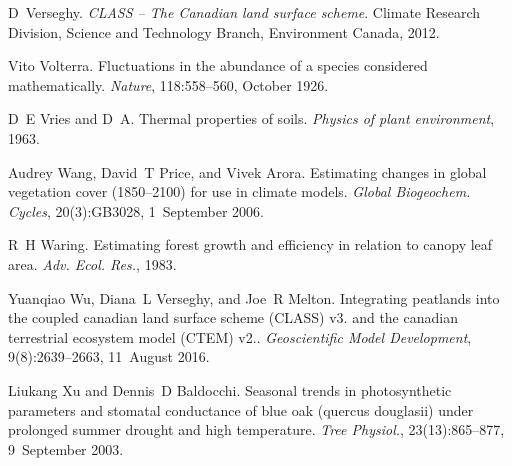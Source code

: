 \begin{DoxyDescription}
\item[\label{_CITEREF_Verseghy2012-c0e}%
\mbox{[}72\mbox{]}]D~Verseghy. {\itshape C\+L\+A\+S\+S -- The Canadian land surface scheme}. Climate Research Division, Science and Technology Branch, Environment Canada, 2012.


\item[\label{_CITEREF_Volterra1926-iz}%
\mbox{[}73\mbox{]}]Vito Volterra. Fluctuations in the abundance of a species considered mathematically. {\itshape Nature}, 118\+:558--560, October 1926. 


\item[\label{_CITEREF_Vries1963-ti}%
\mbox{[}74\mbox{]}]D~E Vries and D~A. Thermal properties of soils. {\itshape Physics of plant environment}, 1963.


\item[\label{_CITEREF_Wang2006-he}%
\mbox{[}75\mbox{]}]Audrey Wang, David~T Price, and Vivek Arora. Estimating changes in global vegetation cover (1850–2100) for use in climate models. {\itshape Global Biogeochem. Cycles}, 20(3)\+:G\+B3028, 1~September 2006. 


\item[\label{_CITEREF_Waring1983-wc}%
\mbox{[}76\mbox{]}]R~H Waring. Estimating forest growth and efficiency in relation to canopy leaf area. {\itshape Adv. Ecol. Res.}, 1983. 


\item[\label{_CITEREF_Wu2016-zt}%
\mbox{[}77\mbox{]}]Yuanqiao Wu, Diana~L Verseghy, and Joe~R Melton. Integrating peatlands into the coupled canadian land surface scheme (C\+L\+A\+S\+S) v3. and the canadian terrestrial ecosystem model (C\+T\+E\+M) v2.. {\itshape Geoscientific Model Development}, 9(8)\+:2639--2663, 11~August 2016. 


\item[\label{_CITEREF_Xu2003-d75}%
\mbox{[}78\mbox{]}]Liukang Xu and Dennis~D Baldocchi. Seasonal trends in photosynthetic parameters and stomatal conductance of blue oak (quercus douglasii) under prolonged summer drought and high temperature. {\itshape Tree Physiol.}, 23(13)\+:865--877, 9~September 2003.


\end{DoxyDescription}